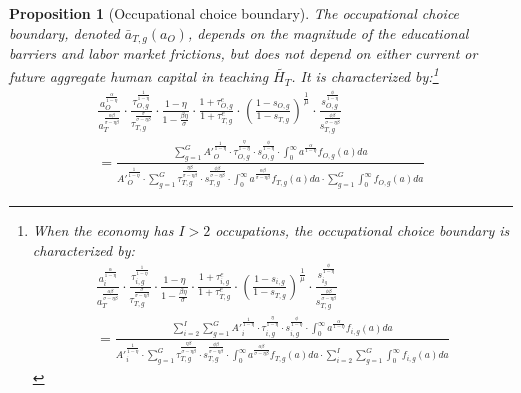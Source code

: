 \documentclass[onehalfspacing,11pt]{article}
\newtheorem{prp}{Proposition}
\begin{document}
\begin{prp}[Occupational choice boundary] The occupational choice boundary, denoted $\bar{a}_{T,g}(a_O)$, depends on the magnitude of the educational barriers and labor market frictions, but does not depend on either current or future aggregate human capital in teaching $\widetilde{H_T}$. It is characterized by:\footnote{When the economy has $I>2$ occupations, the occupational choice boundary is characterized by:
\begin{align*}
\label{eq:occChoice}
\frac{a_i^{\frac{\alpha}{1-\eta}}}{a_T^{\frac{\alpha\beta}{\sigma-\eta\beta}}} \cdot \frac{\tau_{i,g}^\frac{1}{1-\eta}}{\tau_{T,g}^\frac{\sigma}{\sigma-\eta\beta}} \cdot \frac{1-\eta}{1-\tfrac{\beta \eta}{\sigma}} \cdot \frac{1+\tau^e_{i,g}}{1+\tau^e_{T,g}} \cdot \left(\frac{1-s_{i,g}}{1-s_{T,g}}\right)^\frac{1}{\mu} \cdot \frac{s_{i_g}^\frac{\phi}{1-\eta}}{s_{T,g}^\frac{\phi\beta}{\sigma-\eta\beta}} \nonumber\\
= \frac{\sum_{i=2}^I \sum_{g=1}^G {A}'_i^\frac{1}{1-\eta} \cdot \tau_{i,g}^\frac{\eta}{1-\eta} \cdot s_{i,g}^{\frac{\phi}{1-\eta}} \cdot \int_0^\infty a^{\frac{\alpha}{1-\eta}} f_{i,g}(a)da }{{A}'_i^\frac{1}{1-\eta} \cdot \sum_{g=1}^G \tau_{T,g}^\frac{\eta\beta}{\sigma-\eta\beta} \cdot s_{T,g}^\frac{\phi\beta}{\sigma-\eta\beta} \cdot \int_0^\infty a^{\frac{\alpha\beta}{\sigma-\eta\beta}} f_{T,g}(a)da \cdot \sum_{i=2}^I \sum_{g=1}^G \int_0^\infty f_{i,g}(a)da  } 
\end{align*}
}
\begin{align}
\label{eq:occChoice}
\frac{a_O^{\frac{\alpha}{1-\eta}}}{a_T^{\frac{\alpha\beta}{\sigma-\eta\beta}}} \cdot \frac{\tau_{O,g}^\frac{1}{1-\eta}}{\tau_{T,g}^\frac{\sigma}{\sigma-\eta\beta}} \cdot \frac{1-\eta}{1-\tfrac{\beta \eta}{\sigma}} \cdot \frac{1+\tau^e_{O,g}}{1+\tau^e_{T,g}} \cdot \left(\frac{1-s_{O,g}}{1-s_{T,g}}\right)^\frac{1}{\mu} \cdot \frac{s_{O,g}^\frac{\phi}{1-\eta}}{s_{T,g}^\frac{\phi\beta}{\sigma-\eta\beta}} \nonumber\\
= \frac{\sum_{g=1}^G {A}'_O^{\frac{1}{1-\eta}} \cdot \tau_{O,g}^\frac{\eta}{1-\eta} \cdot s_{O,g}^{\frac{\phi}{1-\eta}} \cdot \int_0^\infty a^{\frac{\alpha}{1-\eta}} f_{O,g}(a)da }{{A}'_O^\frac{1}{1-\eta} \cdot \sum_{g=1}^G \tau_{T,g}^\frac{\eta\beta}{\sigma-\eta\beta} \cdot s_{T,g}^\frac{\phi\beta}{\sigma-\eta\beta} \cdot \int_0^\infty a^{\frac{\alpha\beta}{\sigma-\eta\beta}} f_{T,g}(a)da \cdot \sum_{g=1}^G \int_0^\infty f_{O,g}(a)da  } 
\end{align}
\end{prp}
\end{document}
